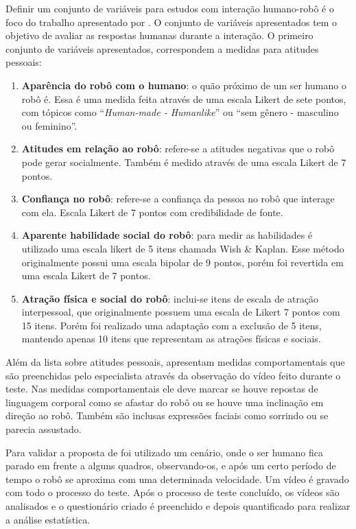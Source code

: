 Definir um conjunto de variáveis para estudos com interação humano-robô é o foco do trabalho apresentado por \textcite{joosse:2011}. O conjunto de variáveis apresentados tem o objetivo de avaliar as respostas humanas durante a interação. O primeiro conjunto de variáveis apresentados, correspondem a medidas para atitudes pessoais:

\begin{enumerate}
	\item \textbf{Aparência do robô com o humano}: o quão próximo de um ser humano o robô é. Essa é uma medida feita através de uma escala Likert de sete pontos, com tópicos como ``\emph{Human-made - Humanlike}'' ou ``sem gênero - masculino ou feminino''.
	\item \textbf{Atitudes em relação ao robô}: refere-se a atitudes negativas que o robô pode gerar socialmente. Também é medido através de uma escala Likert de 7 pontos.
	\item \textbf{Confiança no robô}: refere-se a confiança da pessoa no robô que interage com ela. Escala Likert de 7 pontos com credibilidade de fonte.
	\item \textbf{Aparente habilidade social do robô}: para medir as habilidades é utilizado uma escala likert de 5 itens chamada Wish \& Kaplan. Esse método originalmente possui uma escala bipolar de 9 pontos, porém foi revertida em uma escala Likert de 7 pontos.
	\item \textbf{Atração física e social do robô}: inclui-se itens de escala de atração interpessoal, que originalmente possuem uma escala de Likert 7 pontos com 15 itens. Porém foi realizado uma adaptação com a exclusão de 5 itens, mantendo apenas 10 itens que representam as atrações físicas e sociais.
\end{enumerate}

Além da lista sobre atitudes pessoais, \textcite{joosse:2011} apresentam medidas comportamentais que são preenchidas pelo especialista através da observação do vídeo feito durante o teste. Nas medidas comportamentais ele deve marcar se houve repostas de linguagem corporal como se afastar do robô ou se houve uma inclinação em direção ao robô. Também são inclusas expressões faciais como sorrindo ou se parecia assustado.

Para validar a proposta de \textcite{joosse:2011} foi utilizado um cenário, onde o ser humano fica parado em frente a alguns quadros, observando-os, e após um certo período de tempo o robô se aproxima com uma determinada velocidade. Um vídeo é gravado com todo o processo do teste. Após o processo de teste concluído, os vídeos são analisados e o questionário criado é preenchido e depois quantificado para realizar a análise estatística.

